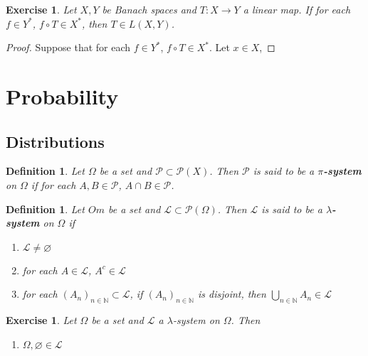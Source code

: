 \documentclass[12pt]{amsart}
\newtheorem{defn}[thm]{Definition}
\newtheorem{ex}[thm]{Exercise}
\newcommand{\lam}{\lambda}
\newcommand{\Om}{\Omega}
\newcommand{\N}{\mathbb{N}}
\newcommand{\ML}{\mathcal{L}}
\newcommand{\MP}{\mathcal{P}}
\begin{document}
\begin{ex}
	Let $X, Y$ be Banach spaces and $T:X \rightarrow Y$ a linear map. If for each $f \in Y^*$, $f \circ T \in X^*$, then $T \in L(X,Y)$. 
\end{ex}

\begin{proof}
	Suppose that for each $f \in Y^*$, $f \circ T \in X^*$. Let $x \in X$, 
\end{proof}




























\newpage

\section{Probability}
\subsection{Distributions}

\begin{defn}
	Let $\Om$ be a set and $\MP \subset \MP(X)$. Then $\MP$ is said to be a \textbf{$\pi$-system} on $\Om$ if for each $A,B \in \MP$, $A \cap B \in \MP$.
\end{defn}

\begin{defn}
	Let $Om$ be a set and $\ML \subset \MP(\Om)$. Then $\ML$ is said to be a \textbf{$\lam$-system} on $\Om$ if 
	\begin{enumerate}
		\item $\ML \neq \varnothing$
		\item for each $A \in \ML$, $A^c \in \ML$
		\item for each $(A_n)_{n \in \N} \subset \ML$, if $(A_n)_{n \in \N}$ is disjoint, then $\bigcup\limits_{n \in \N}A_n \in \ML$
	\end{enumerate}
\end{defn}

\begin{ex}
	Let $\Om$ be a set and $\ML$ a $\lam$-system on $\Om$. Then 
	\begin{enumerate}
		\item $\Om, \varnothing \in \ML$
	\end{enumerate} 
\end{ex}
\end{document}

